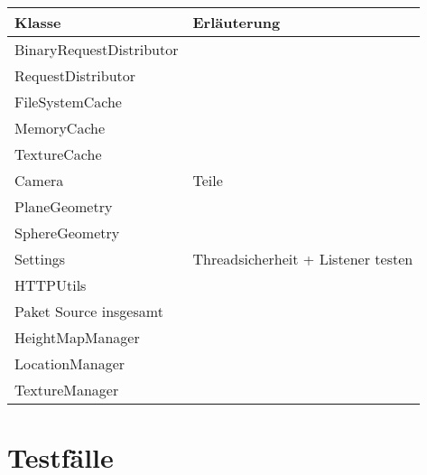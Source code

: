\documentclass[10pt]{scrreprt}
\begin{document}
\begin{tabular}{|p{4cm}|p{10cm}|}
\hline 
\rule[-1ex]{0pt}{4ex} Klasse & Erläuterung \\ 
\hline
\rule[-1ex]{0pt}{4ex} BinaryRequestDistributor & \\ 
\hline
\rule[-1ex]{0pt}{4ex} RequestDistributor & \\ 
\hline
\rule[-1ex]{0pt}{4ex} FileSystemCache & \\ 
\hline
\rule[-1ex]{0pt}{4ex} MemoryCache & \\ 
\hline
\rule[-1ex]{0pt}{4ex} TextureCache & \\ 
\hline
\rule[-1ex]{0pt}{4ex} Camera & Teile \\ 
\hline
\rule[-1ex]{0pt}{4ex} PlaneGeometry & \\ 
\hline
\rule[-1ex]{0pt}{4ex} SphereGeometry & \\ 
\hline
\rule[-1ex]{0pt}{4ex} Settings & Threadsicherheit + Listener testen \\ 
\hline
\rule[-1ex]{0pt}{4ex} HTTPUtils & \\ 
\hline
\rule[-1ex]{0pt}{4ex} Paket Source insgesamt & \\ 
\hline
\rule[-1ex]{0pt}{4ex} HeightMapManager & \\ 
\hline
\rule[-1ex]{0pt}{4ex} LocationManager & \\ 
\hline
\rule[-1ex]{0pt}{4ex} TextureManager & \\ 
\hline

\end{tabular}

\newpage
\section{Testfälle}
\end{document}
